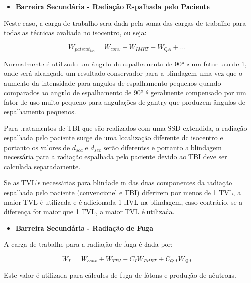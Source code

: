 \documentclass[11pt,a4paper]{article}
\begin{document}
        \begin{itemize}
            \item \textbf{\textcolor{CarnationPink}{Barreira Secundária - Radiação Espalhada pelo Paciente}}
        \end{itemize}

        Neste caso, a carga de trabalho sera dada pela soma das cargas de trabalho para todas as técnicas avaliada no isocentro, ou seja:

        \begin{equation}
            W_{pat scat_{iso}} = W_{conv} + W_{IMRT} + W_{QA} + \dots
        \end{equation}

        Normalmente é utilizado um ângulo de espalhamento de \ang{90} e um fator uso de 1, onde será alcançado um resultado conservador para a blindagem uma vez que o aumento da intensidade para angulos de espalhamento pequenos quando comparados ao angulo de espalhamento de \ang{90} é geralmente compensado por um fator de uso muito pequeno para angulações de gantry que produzem ângulos de espalhamento pequenos.

        Para tratamentos de TBI que são realizados com uma SSD extendida, a radiação espalhada pelo paciente surge de uma localização diferente  do isocentro e portanto os valores de $d_{sca}$ e $d_{sec}$ serão diferentes e portanto a blindagem necessária para a radiação espalhada pelo paciente devido ao TBI deve ser calculada separadamente.

        Se as TVL's necessárias para blindade m das duas componentes da radiação espalhada pelo paciente (convencionel e TBI) diferirem por menos de 1 TVL, a maior TVL é utilizada e é adicionada 1 HVL na blindagem, caso contrário, se a diferença for maior que 1 TVL, a maior TVL é utilizada. 

        \begin{itemize}
            \item \textbf{\textcolor{CarnationPink}{Barreira Secundária - Radiação de Fuga}}
        \end{itemize}


        A carga de trabalho para a radiação de fuga é dada por:

        \begin{equation}
            W_L = W_{conv} + W_{TBI} + C_I W_{IMRT} + C_{QA} W_{QA}
        \end{equation}

        Este valor é utilizada para cálculos de fuga de fótons e produção de nêutrons.
\end{document}
